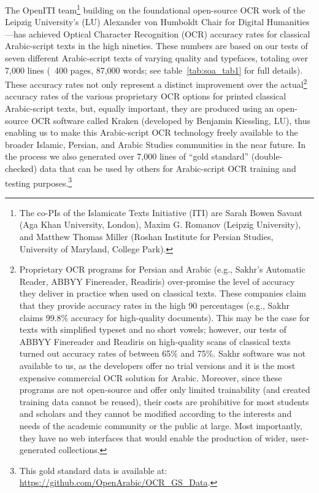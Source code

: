 The OpenITI team\footnote{The co-PIs of the Islamicate Texts Initiative (ITI)
are Sarah Bowen Savant (Aga Khan University, London), Maxim G. Romanov (Leipzig
University), and Matthew Thomas Miller (Roshan Institute for Persian Studies,
University of Maryland, College Park).} building on the foundational
open-source OCR work of the Leipzig University’s (LU) Alexander von Humboldt
Chair for Digital Humanities—has achieved Optical Character Recognition (OCR)
accuracy rates for classical Arabic-script texts in the high nineties. These
numbers are based on our tests of seven different Arabic-script texts of
varying quality and typefaces, totaling over 7,000 lines (~400 pages, 87,000
words; see table~\ref{tab:soa_tab1} for full details). These accuracy rates not
only represent a distinct improvement over the actual\footnote{Proprietary OCR
programs for Persian and Arabic (e.g., Sakhr’s Automatic Reader, ABBYY
Finereader, Readiris) over-promise the level of accuracy they deliver in
practice when used on classical texts. These companies claim that they provide
accuracy rates in the high 90 percentages (e.g., Sakhr claims 99.8\% accuracy
for high-quality documents). This may be the case for texts with simplified
typeset and no short vowels; however, our tests of ABBYY Finereader and
Readiris on high-quality scans of classical texts turned out accuracy rates of
between 65\% and 75\%.  Sakhr software was not available to us, as the
developers offer no trial versions and it is the most expensive commercial OCR
solution for Arabic.  Moreover, since these programs are not open-source and
offer only limited trainability (and created training data cannot be reused),
their costs are prohibitive for most students and scholars and they cannot be
modified according to the interests and needs of the academic community or the
public at large. Most importantly, they have no web interfaces that would
enable the production of wider, user-generated collections.} accuracy rates of
the various proprietary OCR options for printed classical Arabic-script texts,
but, equally important, they are produced using an open-source OCR software
called Kraken (developed by Benjamin Kiessling, LU), thus enabling us to make
this Arabic-script OCR technology freely available to the broader Islamic,
Persian, and Arabic Studies communities in the near future. In the process we
also generated over 7,000 lines of “gold standard” (double-checked) data that
can be used by others for Arabic-script OCR training and testing
purposes.\footnote{This gold standard data is available at:
\url{https://github.com/OpenArabic/OCR_GS_Data}.}

